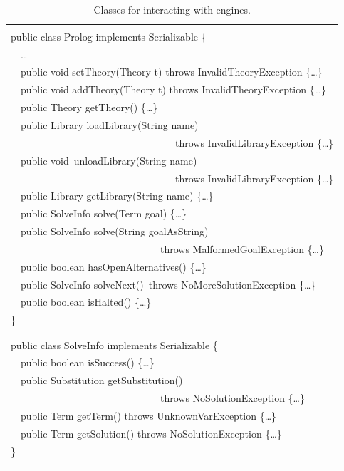 \begin{table}
    \renewcommand\arraystretch{1}
    \begin{center}{\tt
    \begin{tabular}{p{14cm}}\hline\\
    public class Prolog implements Serializable \{\\
    ~~\ldots\\
    ~~public void setTheory(Theory t) throws InvalidTheoryException \{\ldots\}\\
    ~~public void addTheory(Theory t) throws InvalidTheoryException \{\ldots\}\\
    ~~public Theory getTheory() \{\ldots\}\\
    ~~public Library loadLibrary(String name)\\
    ~~~~~~~~~~~~~~~~~~~~~~~~~~~~~~~~~throws InvalidLibraryException \{\ldots\}\\
    ~~public void~unloadLibrary(String name)\\
    ~~~~~~~~~~~~~~~~~~~~~~~~~~~~~~~~~throws InvalidLibraryException \{\ldots\}\\
    ~~public Library getLibrary(String name) \{\ldots\}\\
    ~~public SolveInfo solve(Term goal) \{\ldots\}\\
    ~~public SolveInfo solve(String goalAsString)\\
    ~~~~~~~~~~~~~~~~~~~~~~~~~~~~~~throws MalformedGoalException \{\ldots\}\\
    ~~public boolean hasOpenAlternatives() \{\ldots\}\\
    ~~public SolveInfo solveNext()~throws NoMoreSolutionException \{\ldots\}\\
    ~~public boolean isHalted() \{\ldots\}\\
    \}\\
    \\\hline\\
    public class SolveInfo implements Serializable \{\\
    ~~public boolean isSuccess() \{\ldots\}\\
    ~~public Substitution getSubstitution()\\
    ~~~~~~~~~~~~~~~~~~~~~~~~~~~~~~throws NoSolutionException \{\ldots\}\\
    ~~public Term getTerm() throws UnknownVarException \{\ldots\}\\
    ~~public Term  getSolution() throws NoSolutionException \{\ldots\}\\
    \}\\
    \\\hline
    \end{tabular}}
    \end{center}
    \caption{Classes for interacting with \tuprolog{} engines.}
    \label{tab:engine-interface}
\end{table}

